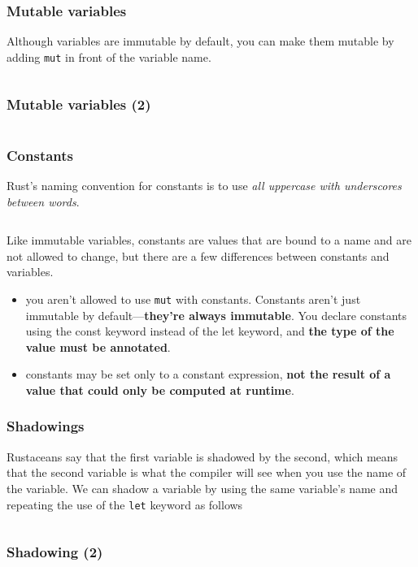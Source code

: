 \documentclass{beamer}
\begin{document}
	\begin{frame}[fragile]
		\frametitle{Mutable variables}
		Although variables are immutable by default, you can make them mutable by adding \texttt{mut} in front of the variable name.
		
		\inputminted{rust}{./code/mutable-variable.rs}
	\end{frame}
	
	\begin{frame}[fragile]
		\frametitle{Mutable variables (2)}
		\inputminted{shell}{./code/mutable-variable.shell}
	\end{frame}
	
	\begin{frame}[fragile]
		\frametitle{Constants}
		Rust’s naming convention for constants is to use \textit{all uppercase with underscores between words}.
		\inputminted[linenos=false, frame=none]{rust}{./code/const.rs}
		Like immutable variables, constants are values that are bound to a name and are not allowed to change, but there are a few differences between constants and variables.
		
		\begin{itemize}
			\item you aren’t allowed to use \texttt{mut} with constants. Constants aren’t just immutable by default—\textbf{they’re always immutable}. You declare constants using the const keyword instead of the let keyword, and \textbf{the type of the value must be annotated}.
			
			\item 		constants may be set only to a constant expression, \textbf{not the result of a value that could only be computed at runtime}.
		\end{itemize}
	\end{frame}
	
	\begin{frame}[fragile]
		\frametitle{Shadowings}
		Rustaceans say that the first variable is shadowed by the second, which means that the second variable is what the compiler will see when you use the name of the variable.  We can shadow a variable by using the same variable’s name and repeating the use of the \texttt{let} keyword as follows
		
		\inputminted{rust}{./code/shadowing.rs}
	\end{frame}
	
	\begin{frame}[fragile]
		\frametitle{Shadowing (2)}
		\inputminted{shell}{./code/shadowing.shell}
	\end{frame}
	
\end{document}
